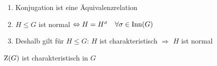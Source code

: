 \begin{remark}
	\begin{enumerate}[label=(\alph*)]
		\item Konjugation ist eine Äquivalenzrelation
		\item $H\le G$ ist normal $\Leftrightarrow H=H^\sigma\quad\forall\sigma\in\operatorname{Inn}(G)$
		\item Deshalb gilt für $H\le G$: $H$ ist charakteristisch $\Rightarrow$ $H$ ist normal
	\end{enumerate}
\end{remark}

\begin{example}
	$\operatorname{Z}(G)$ ist charakteristisch in $G$
\end{example}
